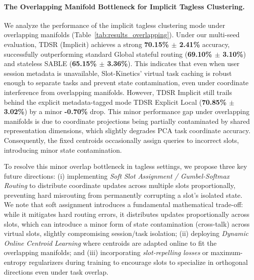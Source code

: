 \paragraph{The Overlapping Manifold Bottleneck for Implicit Tagless Clustering.}
We analyze the performance of the implicit tagless clustering mode under overlapping manifolds (Table~\ref{tab:results_overlapping}). Under our multi-seed evaluation, TDSR (Implicit) achieves a strong \textbf{70.15\% $\pm$ 2.41\%} accuracy, successfully outperforming standard Global stateful routing (\textbf{69.10\% $\pm$ 3.10\%}) and stateless SABLE (\textbf{65.15\% $\pm$ 3.36\%}). This indicates that even when user session metadata is unavailable, Slot-Kinetics' virtual task caching is robust enough to separate tasks and prevent state contamination, even under coordinate interference from overlapping manifolds. However, TDSR Implicit still trails behind the explicit metadata-tagged mode TDSR Explicit Local (\textbf{70.85\% $\pm$ 3.02\%}) by a minor \textbf{-0.70\%} drop. This minor performance gap under overlapping manifolds is due to coordinate projections being partially contaminated by shared representation dimensions, which slightly degrades PCA task coordinate accuracy. Consequently, the fixed centroids occasionally assign queries to incorrect slots, introducing minor state contamination. 

To resolve this minor overlap bottleneck in tagless settings, we propose three key future directions: (i) implementing \emph{Soft Slot Assignment / Gumbel-Softmax Routing} to distribute coordinate updates across multiple slots proportionally, preventing hard misrouting from permanently corrupting a slot's isolated state. We note that soft assignment introduces a fundamental mathematical trade-off: while it mitigates hard routing errors, it distributes updates proportionally across slots, which can introduce a minor form of state contamination (cross-talk) across virtual slots, slightly compromising session/task isolation; (ii) deploying \emph{Dynamic Online Centroid Learning} where centroids are adapted online to fit the overlapping manifolds; and (iii) incorporating \emph{slot-repelling losses} or maximum-entropy regularizers during training to encourage slots to specialize in orthogonal directions even under task overlap.


